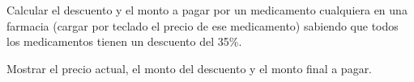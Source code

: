 Calcular el descuento y el monto a pagar por un medicamento cualquiera en una farmacia (cargar por teclado el precio de ese medicamento) sabiendo que todos los medicamentos tienen un descuento del 35\%. 

Mostrar el precio actual, el monto del descuento y el monto final a pagar.